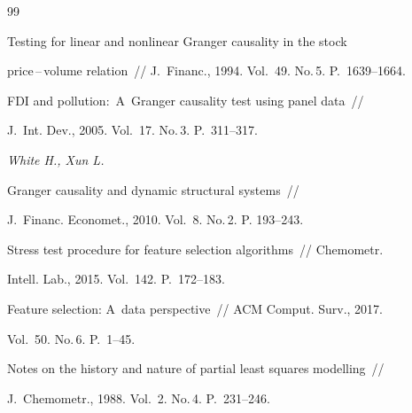 {{\begin{thebibliography}{99}

Testing for linear and nonlinear Granger causality in the stock

price\,--\,volume relation~/\!\!/ J.~Financ., 1994. Vol.~49. No.\,5. P.~1639--1664.






FDI and pollution:~A~Granger causality test using panel data~/\!\!/ 

J.~Int. Dev., 2005. Vol.~17. No.\,3. P.~311--317.





\textit{White H., Xun L.}

Granger causality and dynamic structural systems~/\!\!/ 

J.~Financ. Economet., 2010. Vol.~8. No.\,2. P. 193--243.






Stress test procedure for feature selection algorithms~/\!\!/ Chemometr. 

 Intell. Lab., 2015. Vol.~142. P.~172--183.






Feature selection: A~data perspective~/\!\!/ ACM Comput. Surv., 2017. 

Vol.~50. No.\,6. P.~1--45.






Notes on the history and nature of partial least squares modelling~/\!\!/ 

J.~Chemometr., 1988. Vol.~2. No.\,4. P.~231--246.






\end{thebibliography}}}
